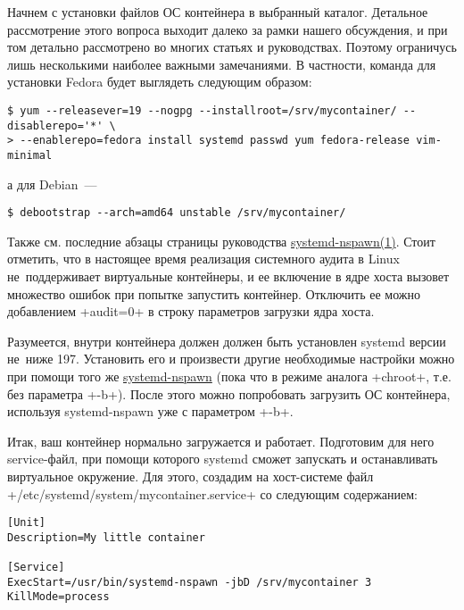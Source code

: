 \documentclass[10pt,oneside,a4paper]{article}
\begin{document}
Начнем с установки файлов ОС контейнера в выбранный каталог. Детальное
рассмотрение этого вопроса выходит далеко за рамки нашего обсуждения, и
при том детально рассмотрено во многих статьях и руководствах. Поэтому
ограничусь лишь несколькими наиболее важными замечаниями. В частности, команда
для установки Fedora будет выглядеть следующим образом:
\begin{Verbatim}
$ yum --releasever=19 --nogpg --installroot=/srv/mycontainer/ --disablerepo='*' \
> --enablerepo=fedora install systemd passwd yum fedora-release vim-minimal
\end{Verbatim}
а для Debian~---
\begin{Verbatim}
$ debootstrap --arch=amd64 unstable /srv/mycontainer/
\end{Verbatim}
Также см. последние абзацы страницы руководства
\href{http://www.freedesktop.org/software/systemd/man/systemd-nspawn.html}{systemd-nspawn(1)}.
Стоит отметить, что в настоящее время реализация системного аудита в Linux
не~поддерживает виртуальные контейнеры, и ее включение в ядре хоста вызовет
множество ошибок при попытке запустить контейнер. Отключить ее можно добавлением
+audit=0+ в строку параметров загрузки ядра хоста.

Разумеется, внутри контейнера должен должен быть установлен systemd версии
не~ниже 197. Установить его и произвести другие необходимые настройки можно при
помощи того же \hyperref[sec:chroots]{systemd-nspawn} (пока что в режиме аналога
+chroot+, т.е. без параметра +-b+). После этого можно попробовать загрузить ОС
контейнера, используя systemd-nspawn уже с параметром +-b+.

Итак, ваш контейнер нормально загружается и работает. Подготовим для него
service-файл, при помощи которого systemd сможет запускать и останавливать
виртуальное окружение. Для этого, создадим на хост-системе файл
+/etc/systemd/system/mycontainer.service+ со следующим содержанием:
\begin{Verbatim}
[Unit]
Description=My little container

[Service]
ExecStart=/usr/bin/systemd-nspawn -jbD /srv/mycontainer 3
KillMode=process
\end{Verbatim}
\end{document}
